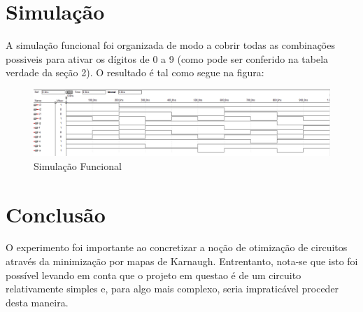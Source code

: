 \documentclass[a4paper]{article}
\begin{document}
\FloatBarrier
\section{Simulação}

A simulação funcional foi organizada de modo a cobrir todas as combinações possiveis para ativar os dígitos de 0 a 9 (como pode ser conferido na tabela verdade da seção 2). O resultado é tal como segue na figura:

\begin{figure}[h!]
  \centering
  \includegraphics[scale=0.4]{simulacao.png}
  \caption{Simulação Funcional}
\end{figure}


\FloatBarrier

\section{Conclusão}
O experimento foi importante ao concretizar a noção  de otimização de circuitos através da minimização por mapas de Karnaugh. Entrentanto, nota-se que isto foi possível levando em conta que o projeto em questao é de um circuito relativamente simples e, para algo mais complexo, seria impraticável proceder desta maneira.
\end{document}
